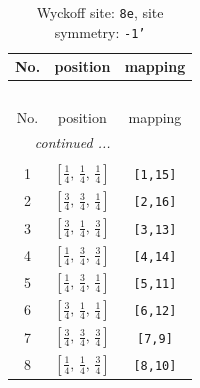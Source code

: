 \documentclass[fleqn,8pt]{jsarticle}
\begin{document}
\renewcommand{\arraystretch}{1.2}
\begin{longtable}{ccc}
\caption{Wyckoff site: {\tt 8e}, site symmetry: {\tt -1'}}
 \\
 \hline \hline
No. & position & mapping \\ \hline \endfirsthead

\multicolumn{2}{l}{\tablename\ \thetable{}} \\
 \hline \hline
No. & position & mapping \\ \hline \endhead

 \hline \hline
\multicolumn{2}{r}{\footnotesize\it continued ...} \\ \endfoot

 \hline \hline
\multicolumn{2}{r}{} \\ \endlastfoot

1 & $\left[ \frac{1}{4},\, \frac{1}{4},\, \frac{1}{4} \right]$ & {\tt [1,15]} \\ \hline
2 & $\left[ \frac{3}{4},\, \frac{3}{4},\, \frac{1}{4} \right]$ & {\tt [2,16]} \\ \hline
3 & $\left[ \frac{3}{4},\, \frac{1}{4},\, \frac{3}{4} \right]$ & {\tt [3,13]} \\ \hline
4 & $\left[ \frac{1}{4},\, \frac{3}{4},\, \frac{3}{4} \right]$ & {\tt [4,14]} \\ \hline
5 & $\left[ \frac{1}{4},\, \frac{3}{4},\, \frac{1}{4} \right]$ & {\tt [5,11]} \\ \hline
6 & $\left[ \frac{3}{4},\, \frac{1}{4},\, \frac{1}{4} \right]$ & {\tt [6,12]} \\ \hline
7 & $\left[ \frac{3}{4},\, \frac{3}{4},\, \frac{3}{4} \right]$ & {\tt [7,9]} \\ \hline
8 & $\left[ \frac{1}{4},\, \frac{1}{4},\, \frac{3}{4} \right]$ & {\tt [8,10]} \\
\end{longtable}
\renewcommand{\arraystretch}{1.2}
\end{document}
